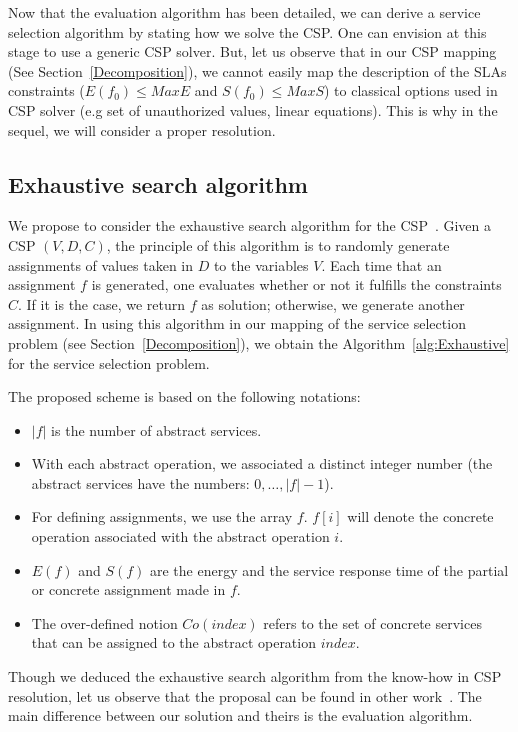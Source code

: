 \documentclass[a4paper]{article}
\begin{document}
Now that the evaluation algorithm has been detailed, we can derive a service selection algorithm 
by stating how we solve the CSP. One can envision at this stage to use a generic CSP solver. 
But, let us observe that in our CSP mapping (See Section~\ref{Decomposition}), we cannot easily map the 
description of the SLAs constraints ($E(f_0) \leq  MaxE$ and 
$S(f_0) \leq  MaxS$) to classical options used in CSP solver (e.g set of unauthorized values, linear equations).  
This is why in the sequel, we will consider a proper resolution.


\subsection{Exhaustive search algorithm}

We propose to consider the exhaustive search algorithm for the CSP~\cite{Baker95intelligentbacktracking,DBLP:journals/concurrency/Estevez-AyresGBD11}. Given a CSP $(V, D, C)$,  the principle of this algorithm is to randomly 
generate assignments of values taken in $D$ to the variables $V$. Each time that an assignment $f$ is generated, 
one evaluates whether or not it fulfills the constraints $C$. If it is the case, we return $f$ as 
solution; otherwise, we generate another assignment. 
In using this algorithm in our mapping of the service selection problem (see Section~\ref{Decomposition}), 
we obtain the Algorithm~\ref{alg:Exhaustive} for the service selection problem. 

The proposed scheme is based on the following notations:
\begin{itemize}
\item $|f|$ is the number of abstract services.
\item With each abstract operation, we associated a distinct integer number (the abstract services have the numbers:  
$0, \dots, |f|-1$). 
\item For defining assignments, we use the array $f$. $f[i]$ will denote the concrete operation  
associated with the abstract operation $i$.
\item $E(f)$ and $S(f)$ are the energy and the service response time of the partial or 
concrete assignment made in $f$.
\item The over-defined notion $Co(index)$ refers to the set of concrete services that can be assigned to 
the abstract operation $index$.
\end{itemize}

Though we deduced the exhaustive search algorithm from the know-how in CSP resolution, let us observe 
that the proposal can be found in other work~\cite{DBLP:journals/concurrency/Estevez-AyresGBD11,Yu:2004:SSA:1018413.1019049}. 
The main difference between our solution and theirs is the evaluation algorithm. 
\end{document}

